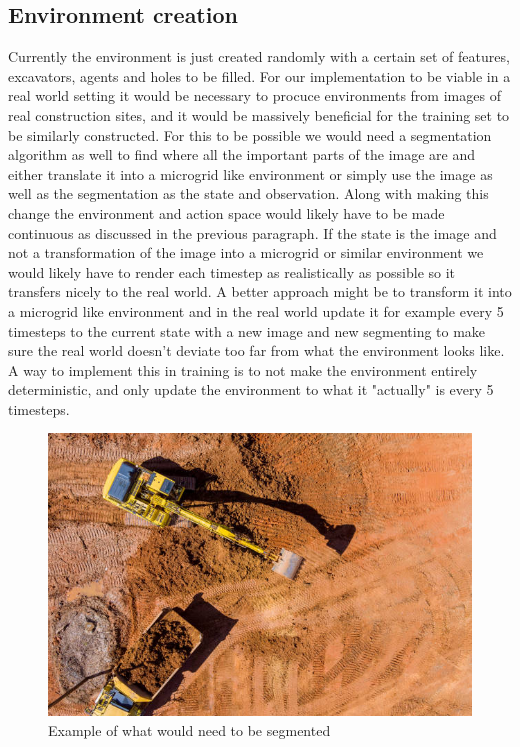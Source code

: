 \documentclass[conference]{IEEEtran}
\begin{document}
	\subsection{Environment creation}
	Currently the environment is just created randomly with a certain set of features, excavators, agents and holes to be filled.
	For our implementation to be viable in a real world setting it would be necessary to procuce environments from images of real construction sites, and it would be massively beneficial for the training set to be similarly constructed.
	For this to be possible we would need a segmentation algorithm as well to find where all the important parts of the image are and either translate it into a microgrid like environment or simply use the image as well as the segmentation as the state and observation.
	Along with making this change the environment and action space would likely have to be made continuous as discussed in the previous paragraph.
	If the state is the image and not a transformation of the image into a microgrid or similar environment we would likely have to render each timestep as realistically as possible so it transfers nicely to the real world.
	A better approach might be to transform it into a microgrid like environment and in the real world update it for example every 5 timesteps to the current state with a new image and new segmenting to make sure the real world doesn't deviate too far from what the environment looks like.
	A way to implement this in training is to not make the environment entirely deterministic, and only update the environment to what it "actually" is every 5 timesteps.

	\begin{figure}[h!]
		\includegraphics[width=\columnwidth]{graphs/construction_site.jpg}
		\caption{Example of what would need to be segmented}
	\end{figure}
\end{document}
